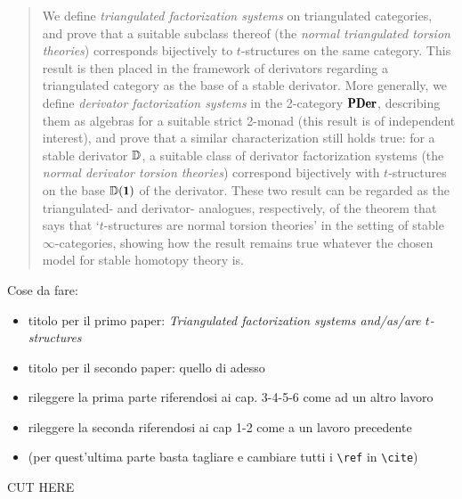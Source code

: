 \documentclass[a4paper,10pt]{amsart}
\begin{document}
\maketitle
\begin{abstract}
We define \emph{triangulated factorization systems} on triangulated categories, and prove that a suitable subclass thereof (the \emph{normal triangulated torsion theories}) corresponds bijectively to $t$-structures on the same category.
This result is then placed in the framework of derivators regarding a triangulated category as the base of a stable derivator. More generally, we define \emph{derivator factorization systems} in the 2-category $\PDer$, describing them as algebras for a suitable strict 2-monad (this result is of independent interest), and prove that a similar characterization still holds true: for a stable derivator $\mathbb{D}$, a suitable class of derivator factorization systems (the \emph{normal derivator torsion theories}) correspond bijectively with $t$-structures on the base $\D(\uno)$ of the derivator.
These two result can be regarded as the triangulated- and derivator- analogues, respectively, of the theorem that says that `$t$-structures are normal torsion theories' in the setting of stable $\infty$-categories, showing how the result remains true whatever the chosen model for stable homotopy theory is.
\end{abstract}

{\color{red} Cose da fare:
\begin{itemize}
\item titolo per il primo paper: \emph{Triangulated factorization systems and/as/are $t$-structures}
\item titolo per il secondo paper: quello di adesso
\item rileggere la prima parte riferendosi ai cap. 3-4-5-6 come ad un altro lavoro
\item rileggere la seconda riferendosi ai cap 1-2 come a un lavoro precedente
\item (per quest'ultima parte basta tagliare e cambiare tutti i \verb|\ref| in \verb|\cite|)
\end{itemize}
}

\tableofcontents




\begin{center}
  \hrulefill \Huge {\color{red} CUT HERE } \hrulefill
\end{center}








\end{document}
